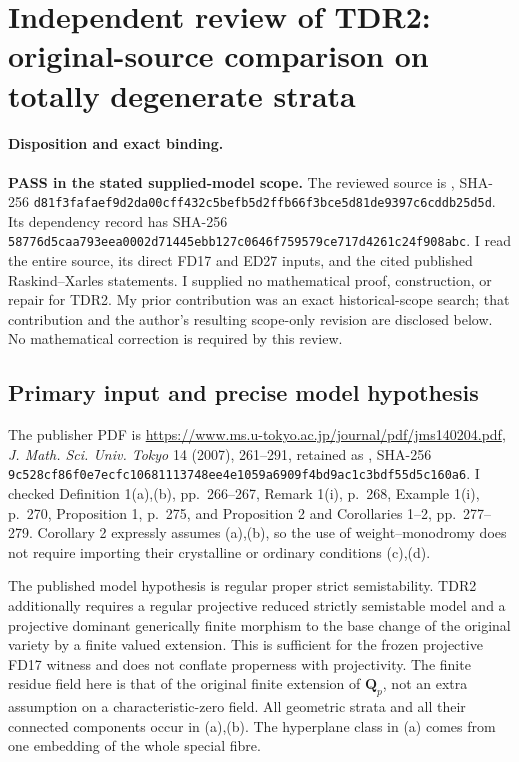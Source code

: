 \section{Independent review of TDR2: original-source comparison on totally degenerate strata}
\label{sc2review:tdr2}

\paragraph{Disposition and exact binding.}
\textbf{PASS in the stated supplied-model scope.}
The reviewed source is
,
SHA-256
\texttt{d81f3fafaef9d2da00cff432c5befb5d2ffb66f3bce5d81de9397c6cddb25d5d}.
Its dependency record has SHA-256
\texttt{58776d5caa793eea0002d71445ebb127c0646f759579ce717d4261c24f908abc}.
I read the entire source, its direct FD17 and ED27 inputs, and the cited
published Raskind--Xarles statements. I supplied no mathematical proof,
construction, or repair for TDR2. My prior contribution was an exact
historical-scope search; that contribution and the author's resulting
scope-only revision are disclosed below. No mathematical correction is
required by this review.

\subsection{Primary input and precise model hypothesis}

The publisher PDF is
\url{https://www.ms.u-tokyo.ac.jp/journal/pdf/jms140204.pdf},
\emph{J. Math. Sci. Univ. Tokyo} 14 (2007), 261--291, retained as
,
SHA-256
\texttt{9c528cf86f0e7ecfc10681113748ee4e1059a6909f4bd9ac1c3bdf55d5c160a6}.
I checked Definition 1(a),(b), pp.~266--267, Remark 1(i), p.~268,
Example 1(i), p.~270, Proposition 1, p.~275, and Proposition 2 and
Corollaries 1--2, pp.~277--279. Corollary 2 expressly assumes (a),(b),
so the use of weight--monodromy does not require importing their
crystalline or ordinary conditions (c),(d).

The published model hypothesis is regular proper strict semistability.
TDR2 additionally requires a regular projective reduced strictly
semistable model and a projective dominant generically finite morphism
to the base change of the original variety by a finite valued extension. This is sufficient for
the frozen projective FD17 witness and does not conflate properness
with projectivity. The finite residue field here is that of the original
finite extension of $\mathbf Q_p$, not an extra assumption on a
characteristic-zero field. All geometric strata and all their connected
components occur in (a),(b). The hyperplane class in (a) comes from one
embedding of the whole special fibre.


